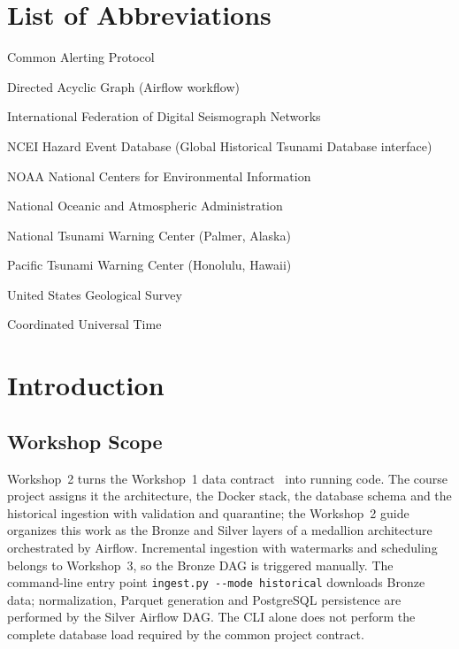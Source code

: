 \documentclass[a4paper,11pt,oneside]{book}
\begin{document}
    \tableofcontents
    \listoffigures
    \listoftables

    \chapter*{List of Abbreviations}
    \begin{abbrv}
        \item[CAP]      Common Alerting Protocol
        \item[DAG]      Directed Acyclic Graph (Airflow workflow)
        \item[FDSN]     International Federation of Digital Seismograph Networks
        \item[HazEL]    NCEI Hazard Event Database (Global Historical Tsunami Database interface)
        \item[NCEI]     NOAA National Centers for Environmental Information
        \item[NOAA]     National Oceanic and Atmospheric Administration
        \item[NTWC]     National Tsunami Warning Center (Palmer, Alaska)
        \item[PTWC]     Pacific Tsunami Warning Center (Honolulu, Hawaii)
        \item[USGS]     United States Geological Survey
        \item[UTC]      Coordinated Universal Time
    \end{abbrv}

    \mainmatter

\chapter{Introduction}
\label{ch:introduction}

\section{Workshop Scope}
Workshop~2 turns the Workshop~1 data contract~\cite{workshop1} into running code.
The course project assigns it the architecture, the Docker stack, the database schema and the historical ingestion with validation and quarantine; the Workshop~2 guide organizes this work as the Bronze and Silver layers of a medallion architecture orchestrated by Airflow.
Incremental ingestion with watermarks and scheduling belongs to Workshop~3, so the Bronze DAG is triggered manually.
The command-line entry point \texttt{ingest.py -{}-mode historical} downloads Bronze data; normalization, Parquet generation and PostgreSQL persistence are performed by the Silver Airflow DAG. The CLI alone does not perform the complete database load required by the common project contract.
\end{document}
